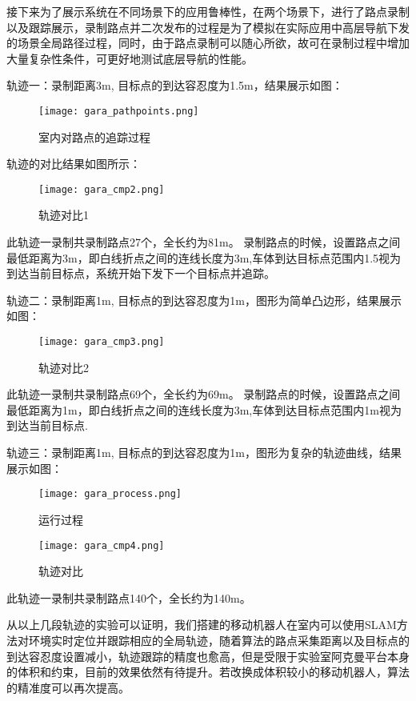 接下来为了展示系统在不同场景下的应用鲁棒性，在两个场景下，进行了路点录制以及跟踪展示，录制路点并二次发布的过程是为了模拟在实际应用中高层导航下发的场景全局路径过程，同时，由于路点录制可以随心所欲，故可在录制过程中增加大量复杂性条件，可更好地测试底层导航的性能。

轨迹一：录制距离3m, 目标点的到达容忍度为1.5m，结果展示如图：

\begin{figure}[ht]
    \centering
    \texttt{[image: gara\_pathpoints.png]}
    \caption{室内对路点的追踪过程}
  \end{figure}

轨迹的对比结果如图所示：

\begin{figure}[ht]
    \centering
    \texttt{[image: gara\_cmp2.png]}
    \caption{轨迹对比1}
  \end{figure}

此轨迹一录制共录制路点27个，全长约为81m。
录制路点的时候，设置路点之间最低距离为3m，即白线折点之间的连线长度为3m,车体到达目标点范围内1.5视为到达当前目标点，系统开始下发下一个目标点并追踪。

轨迹二：录制距离1m, 目标点的到达容忍度为1m，图形为简单凸边形，结果展示如图：
\begin{figure}[ht]
    \centering
    \texttt{[image: gara\_cmp3.png]}
    \caption{轨迹对比2}
  \end{figure}
此轨迹一录制共录制路点69个，全长约为69m。
录制路点的时候，设置路点之间最低距离为1m，即白线折点之间的连线长度为3m,车体到达目标点范围内1m视为到达当前目标点.

轨迹三：录制距离1m, 目标点的到达容忍度为1m，图形为复杂的轨迹曲线，结果展示如图：

\begin{figure}[ht]
    \centering
    \texttt{[image: gara\_process.png]}
    \caption{运行过程}
  \end{figure}

\begin{figure}[ht]
    \centering
    \texttt{[image: gara\_cmp4.png]}
    \caption{轨迹对比}
  \end{figure}
此轨迹一录制共录制路点140个，全长约为140m。

从以上几段轨迹的实验可以证明，我们搭建的移动机器人在室内可以使用SLAM方法对环境实时定位并跟踪相应的全局轨迹，随着算法的路点采集距离以及目标点的到达容忍度设置减小，轨迹跟踪的精度也愈高，但是受限于实验室阿克曼平台本身的体积和约束，目前的效果依然有待提升。若改换成体积较小的移动机器人，算法的精准度可以再次提高。


